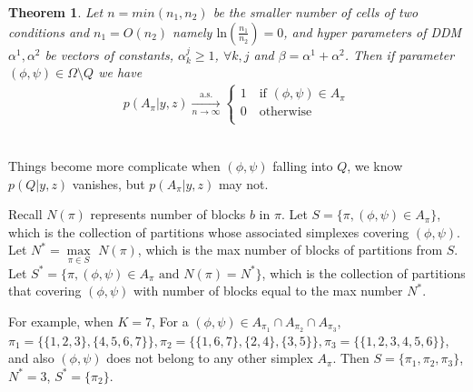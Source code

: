 \documentclass[aoas,preprint]{imsart}
\newtheorem{theorem}{Theorem}
\begin{document}
\begin{theorem} Let $n = min(n_1, n_2)$ be the smaller number of cells of two conditions and $n_1 = O(n_2)$ namely $\text{ln}(\frac{n_1}{n_2}) = 0$, and hyper parameters of DDM $\alpha^1, \alpha^2$ be vectors of constants, $\alpha_k^j \geq 1$, $\forall k, j$ and $\beta = \alpha^1 + \alpha^2$. Then if parameter $(\phi, \psi)\in \Omega\setminus Q $ we have 
\begin{eqnarray*}
    p(A_{\pi} | y, z) \xrightarrow[n\rightarrow\infty]{\text{a.s.}}\left\{
                \begin{array}{ll}
                 1 \quad \text{if }(\phi,\psi) \in A_\pi\\
                 0 \quad \text{otherwise}\\             
                \end{array}
              \right.
\end{eqnarray*}
\end{theorem}
\hfill\\
Things become more complicate when $(\phi, \psi)$ falling into $Q$, we know $p(Q | y, z)$ vanishes, but $p(A_\pi | y,z)$ may not. 

Recall $N(\pi)$ represents number of blocks $b$ in $\pi$. Let $S = \{\pi,  (\phi, \psi) \in A_\pi\}$, which is the collection of partitions whose associated simplexes covering $(\phi,\psi)$. Let $N^* = \underset{\pi\in S}\max$ $N(\pi)$, which is the max number of blocks of partitions from $S$. Let $S^* = \{\pi,  (\phi, \psi) \in A_\pi \text{ and } N(\pi) = N^*\}$, which is the collection of partitions that covering $(\phi, \psi)$ with number of blocks equal to the max number $N^*$. 

For example, when $K = 7$, For a $(\phi, \psi)\in A_{\pi_1} \cap A_{\pi_2} \cap A_{\pi_3}$, $\pi_1 = \{\{1,2,3\}, \{4,5,6,7\}\}, \pi_2 = \{\{1,6,7\}, \{2,4\},\{3,5\}\}, \pi_3 = \{\{1,2,3,4,5,6\}\}$, and also $(\phi, \psi)$ does not belong to any other simplex $A_\pi$. Then $S = \{\pi_1, \pi_2, \pi_3\}$, $N^* = 3$, $S^* = \{\pi_2\}.$ 
\end{document}
